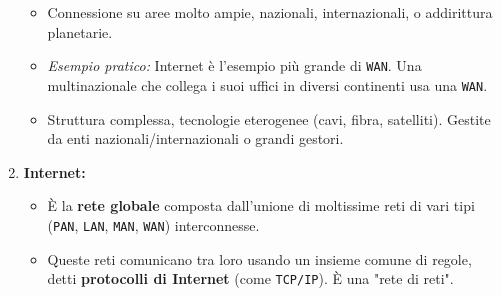 \begin{enumerate}
    \begin{itemize}
        \item Connessione su aree molto ampie, nazionali, internazionali, o addirittura planetarie.
        \item \textit{Esempio pratico:} Internet è l'esempio più grande di \texttt{WAN}. Una multinazionale che collega i suoi uffici in diversi continenti usa una \texttt{WAN}.
        \item Struttura complessa, tecnologie eterogenee (cavi, fibra, satelliti). Gestite da enti nazionali/internazionali o grandi gestori.
    \end{itemize}
    \item \textbf{Internet:}
    \begin{itemize}
        \item È la \textbf{rete globale} composta dall'unione di moltissime reti di vari tipi (\texttt{PAN}, \texttt{LAN}, \texttt{MAN}, \texttt{WAN}) interconnesse.
        \item Queste reti comunicano tra loro usando un insieme comune di regole, detti \textbf{protocolli di Internet} (come \texttt{TCP/IP}). È una "rete di reti".
    \end{itemize}
\end{enumerate}

